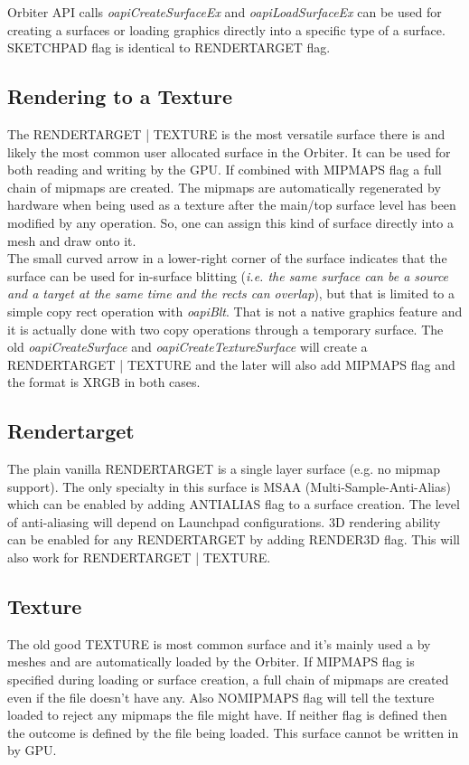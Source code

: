 \documentclass[Orbiter Developer Manual.tex]{subfiles}
\begin{document}
Orbiter API calls \textit{oapiCreateSurfaceEx} and \textit{oapiLoadSurfaceEx} can be used for creating a surfaces or loading graphics directly into a specific type of a surface. 
\textsc{SKETCHPAD} flag is identical to \textsc{RENDERTARGET} flag.

\subsection{Rendering to a Texture}
The \textsc{RENDERTARGET | TEXTURE} is the most versatile surface there is and likely the most common user allocated surface in the Orbiter. It can be used for both reading and writing by the GPU. If combined with \textsc{MIPMAPS} flag a full chain of mipmaps are created. The mipmaps are automatically regenerated by hardware when being used as a texture after the main/top surface level has been modified by any operation. So, one can assign this kind of surface directly into a mesh and draw onto it.\\

The small curved arrow in a lower-right corner of the surface indicates that the surface can be used for in-surface blitting (\textsl{i.e. the same surface can be a source and a target at the same time and the rects can overlap}), but that is limited to a simple copy rect operation with \textit{oapiBlt}. That is not a native graphics feature and it is actually done with two copy operations through a temporary surface. The old \textit{oapiCreateSurface} and \textit{oapiCreateTextureSurface} will create a \textsc{RENDERTARGET | TEXTURE} and the later will also add \textsc{MIPMAPS} flag and the format is XRGB in both cases. 

\subsection{Rendertarget}
The plain vanilla \textsc{RENDERTARGET} is a single layer surface (e.g. no mipmap support). The only specialty in this surface is MSAA (Multi-Sample-Anti-Alias) which can be enabled by adding \textsc{ANTIALIAS} flag to a surface creation. The level of anti-aliasing will depend on Launchpad configurations. 3D rendering ability can be enabled for any \textsc{RENDERTARGET} by adding \textsc{RENDER3D} flag. This will also work for \textsc{RENDERTARGET | TEXTURE}.

\subsection{Texture}
The old good \textsc{TEXTURE} is most common surface and it's mainly used a by meshes and are automatically loaded by the Orbiter. If \textsc{MIPMAPS} flag is specified during loading or surface creation, a full chain of mipmaps are created even if the file doesn't have any. Also \textsc{NOMIPMAPS} flag will tell the texture loaded to reject any mipmaps the file might have. If neither flag is defined then the outcome is defined by the file being loaded. This surface cannot be written in by GPU.
\end{document}
